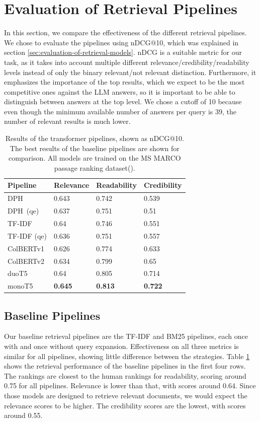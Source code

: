 \section{Evaluation of Retrieval Pipelines}
In this section, we compare the effectiveness of the different retrieval pipelines.
We chose to evaluate the pipelines using nDCG@10, which was explained in section \ref{sec:evaluation-of-retrieval-models}.
nDCG is a suitable metric for our task, as it takes into account multiple different relevance/credibility/readability levels instead of only the binary relevant/not relevant distinction.
Furthermore, it emphasizes the importance of the top results, which we expect to be the most competitive ones against the LLM answers, so it is important to be able to distinguish between answers at the top level.
We chose a cutoff of 10 because even though the minimum available number of answers per query is 39, the number of relevant results is much lower.
\begin{table}[tb]
\centering
\begin{tabularx}{\textwidth}{lXXX}
\hline
Pipeline    & Relevance          & Readability        & Credibility        \\ \hline
DPH         & 0.643 & 0.742 & 0.539 \\
DPH\ (qe)     & 0.637 & 0.751 & 0.51  \\
TF-IDF     & 0.64  & 0.746 & 0.551 \\
TF-IDF (qe) & 0.636 & 0.751 & 0.557 \\
ColBERTv1      & 0.626 & 0.774 & 0.633 \\
ColBERTv2       & 0.634 & 0.799 & 0.65  \\
duoT5            & 0.64  & 0.805 & 0.714 \\
monoT5           & \textbf{0.645} & \textbf{0.813} & \textbf{0.722} \\
\hline
\end{tabularx}
\caption{Results of the transformer pipelines, shown as nDCG@10. The best results of the baseline pipelines are shown for comparison. All models are trained on the MS MARCO passage ranking dataset(\cite{bajaj:2016:MSMARCO}).}
\label{tab:transformer_pipelines}
\end{table}
\subsection{Baseline Pipelines}
Our baseline retrieval pipelines are the TF-IDF and BM25 pipelines, each once with and once without query expansion.
Effectiveness on all three metrics is similar for all pipelines, showing little difference between the strategies.
Table \ref{tab:transformer_pipelines} shows the retrieval performance of the baseline pipelines in the first four rows.
The rankings are closest to the human rankings for readability, scoring around 0.75 for all pipelines.
Relevance is lower than that, with scores around 0.64.
Since those models are designed to retrieve relevant documents, we would expect the relevance scores to be higher.
The credibility scores are the lowest, with scores around 0.55.

